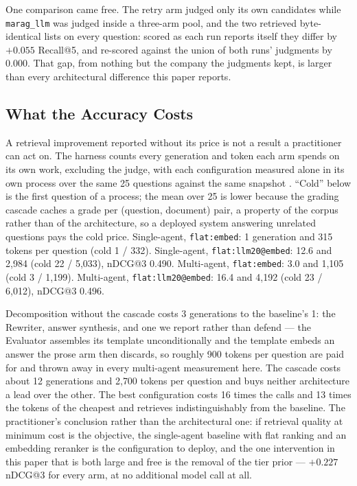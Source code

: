 \documentclass[10pt,conference]{IEEEtran}
\begin{document}
One comparison came free. The retry arm judged only its own candidates while
\texttt{marag\_llm} was judged inside a three-arm pool, and the two retrieved
byte-identical lists on every question: scored as each run reports itself they
differ by $+0.055$ Recall@5, and re-scored against the union of both runs'
judgments by $0.000$. That gap, from nothing but the company the judgments kept, is
larger than every architectural difference this paper reports.

\subsection{What the Accuracy Costs}\label{sec:efficiency}

A retrieval improvement reported without its price is not a result a
practitioner can act on. The harness counts every generation and token each arm
spends on its own work, excluding the judge, with each configuration measured
alone in its own process over the same 25 questions against the same snapshot
. ``Cold'' below is the first question of a
process; the mean over 25 is lower because the grading cascade caches a grade per
(question, document) pair, a property of the corpus rather than of the
architecture, so a deployed system answering unrelated questions pays the cold
price. Single-agent, \texttt{flat:embed}: 1 generation and 315 tokens per question
(cold 1 / 332). Single-agent, \texttt{flat:llm20@embed}: 12.6 and 2{,}984 (cold 22
/ 5{,}033), nDCG@3 0.490. Multi-agent, \texttt{flat:embed}: 3.0 and 1{,}105 (cold
3 / 1{,}199). Multi-agent, \texttt{flat:llm20@embed}: 16.4 and 4{,}192 (cold 23 /
6{,}012), nDCG@3 0.496.

Decomposition without the cascade costs 3 generations to the baseline's 1: the
Rewriter, answer synthesis, and one we report rather than defend --- the Evaluator
assembles its template unconditionally and the template embeds an answer the prose
arm then discards, so roughly 900 tokens per question are paid for and thrown away
in every multi-agent measurement here. The cascade costs about 12 generations and
2{,}700 tokens per question and buys neither architecture a lead over the other.
The best configuration costs 16 times the calls and 13 times the tokens of the
cheapest and retrieves indistinguishably from the baseline. The practitioner's
conclusion rather than the architectural one: if retrieval quality at minimum cost
is the objective, the single-agent baseline with flat ranking and an embedding
reranker is the configuration to deploy, and the one intervention in this paper
that is both large and free is the removal of the tier prior --- $+0.227$ nDCG@3
for every arm, at no additional model call at all.
\end{document}
